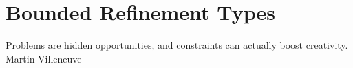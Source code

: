 \chapter{Bounded Refinement Types}\label{boundedrefinements}


\makequote
{Problems are hidden opportunities, and constraints can actually boost creativity.}
{Martin Villeneuve}

\begin{comment}
\makequote
{The more constraints one imposes, the more one frees one's self. \\
And the arbitrariness of the constraint serves only to obtain precision of execution.}
{Igor Stravinsky}
\end{comment}






